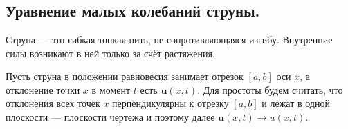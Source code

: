 \chapter{}
\label{lecture11}


\section{Уравнение малых колебаний струны.}
\label{lecture11section1}

\begin{Def}
	Струна --- это гибкая тонкая нить, не сопротивляющаяся изгибу. Внутренние силы возникают в ней только за счёт растяжения.
\end{Def}
Пусть струна в положении равновесия занимает отрезок $[a,b]$ оси $x$, а отклонение точки $x$ в момент $t$ есть $\bm{u}(x,t)$. Для простоты будем считать, что отклонения всех точек $x$ перпендикулярны к отрезку $[a,b]$ и лежат в одной плоскости --- плоскости чертежа и поэтому далее $\bm{u}(x,t)\rightarrow u(x,t)$.

